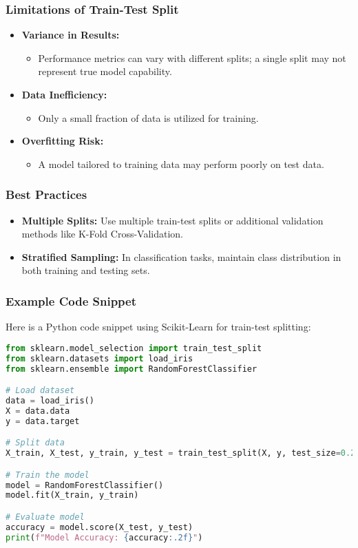 \documentclass[aspectratio=169]{beamer}
\begin{document}
\begin{frame}
    \frametitle{Limitations of Train-Test Split}
    \begin{itemize}
        \item \textbf{Variance in Results:}
        \begin{itemize}
            \item Performance metrics can vary with different splits; a single split may not represent true model capability.
        \end{itemize}

        \item \textbf{Data Inefficiency:}
        \begin{itemize}
            \item Only a small fraction of data is utilized for training.
        \end{itemize}

        \item \textbf{Overfitting Risk:}
        \begin{itemize}
            \item A model tailored to training data may perform poorly on test data.
        \end{itemize}
    \end{itemize}
\end{frame}

\begin{frame}
    \frametitle{Best Practices}
    \begin{itemize}
        \item \textbf{Multiple Splits:} Use multiple train-test splits or additional validation methods like K-Fold Cross-Validation.
        \item \textbf{Stratified Sampling:} In classification tasks, maintain class distribution in both training and testing sets.
    \end{itemize}
\end{frame}

\begin{frame}[fragile]
    \frametitle{Example Code Snippet}
    Here is a Python code snippet using Scikit-Learn for train-test splitting:
    \begin{lstlisting}[language=Python]
from sklearn.model_selection import train_test_split
from sklearn.datasets import load_iris
from sklearn.ensemble import RandomForestClassifier

# Load dataset
data = load_iris()
X = data.data
y = data.target

# Split data
X_train, X_test, y_train, y_test = train_test_split(X, y, test_size=0.2, random_state=42)

# Train the model
model = RandomForestClassifier()
model.fit(X_train, y_train)

# Evaluate model
accuracy = model.score(X_test, y_test)
print(f"Model Accuracy: {accuracy:.2f}")
    \end{lstlisting}
\end{frame}
\end{document}
